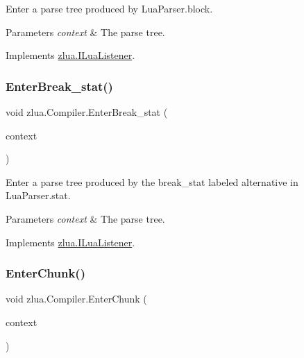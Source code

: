 Enter a parse tree produced by Lua\+Parser.\+block. 


\begin{DoxyParams}{Parameters}
{\em context} & The parse tree.\\
\hline
\end{DoxyParams}


Implements \mbox{\hyperlink{interfacezlua_1_1_i_lua_listener_a490f8ae28bd42601f32bd54fc9058e24}{zlua.\+I\+Lua\+Listener}}.

\mbox{\label{classzlua_1_1_compiler_afb51cc611219670d5372b0d22f1026a3}} 
\subsubsection{\texorpdfstring{Enter\+Break\+\_\+stat()}{EnterBreak\_stat()}}
{\footnotesize\ttfamily void zlua.\+Compiler.\+Enter\+Break\+\_\+stat (\begin{DoxyParamCaption}\item[{\mbox{[}\+Not\+Null\mbox{]} \mbox{\hyperlink{classzlua_1_1_lua_parser_1_1_break__stat_context}{Lua\+Parser.\+Break\+\_\+stat\+Context}}}]{context }\end{DoxyParamCaption})}



Enter a parse tree produced by the {\ttfamily break\+\_\+stat} labeled alternative in Lua\+Parser.\+stat. 


\begin{DoxyParams}{Parameters}
{\em context} & The parse tree.\\
\hline
\end{DoxyParams}


Implements \mbox{\hyperlink{interfacezlua_1_1_i_lua_listener_aa77c8634ee96ca2069ceb9e93b2bae57}{zlua.\+I\+Lua\+Listener}}.

\mbox{\label{classzlua_1_1_compiler_ac52a396b2bba3e5b8767672a72593d79}} 
\subsubsection{\texorpdfstring{Enter\+Chunk()}{EnterChunk()}}
{\footnotesize\ttfamily void zlua.\+Compiler.\+Enter\+Chunk (\begin{DoxyParamCaption}\item[{\mbox{[}\+Not\+Null\mbox{]} \mbox{\hyperlink{classzlua_1_1_lua_parser_1_1_chunk_context}{Lua\+Parser.\+Chunk\+Context}}}]{context }\end{DoxyParamCaption})}




